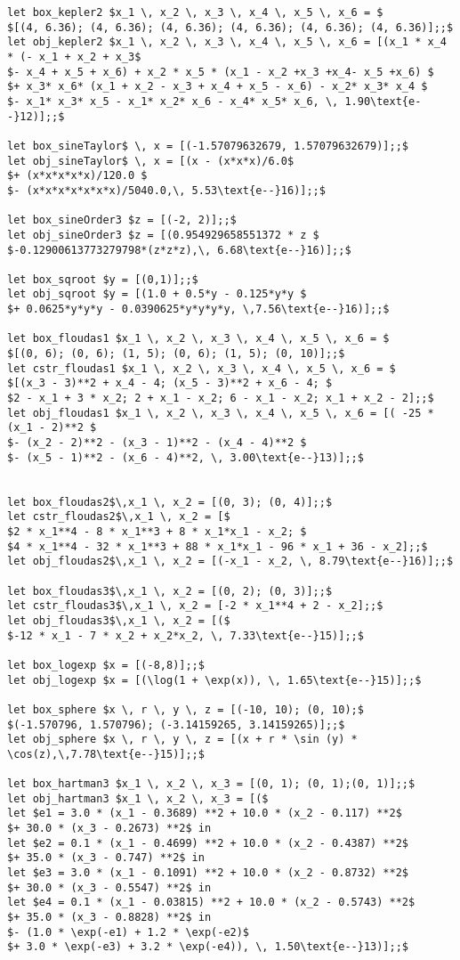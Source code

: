 {\begin{lstlisting}
let box_kepler2 $x_1 \, x_2 \, x_3 \, x_4 \, x_5 \, x_6 = $
$[(4, 6.36); (4, 6.36); (4, 6.36); (4, 6.36); (4, 6.36); (4, 6.36)];;$
let obj_kepler2 $x_1 \, x_2 \, x_3 \, x_4 \, x_5 \, x_6 = [(x_1 * x_4 * (- x_1 + x_2 + x_3$
$- x_4 + x_5 + x_6) + x_2 * x_5 * (x_1 - x_2 +x_3 +x_4- x_5 +x_6) $
$+ x_3* x_6* (x_1 + x_2 - x_3 + x_4 + x_5 - x_6) - x_2* x_3* x_4 $
$- x_1* x_3* x_5 - x_1* x_2* x_6 - x_4* x_5* x_6, \, 1.90\text{e--}12)];;$

let box_sineTaylor$ \, x = [(-1.57079632679, 1.57079632679)];;$
let obj_sineTaylor$ \, x = [(x - (x*x*x)/6.0$
$+ (x*x*x*x*x)/120.0 $
$- (x*x*x*x*x*x*x)/5040.0,\, 5.53\text{e--}16)];;$

let box_sineOrder3 $z = [(-2, 2)];;$
let obj_sineOrder3 $z = [(0.954929658551372 * z $
$-0.12900613773279798*(z*z*z),\, 6.68\text{e--}16)];;$

let box_sqroot $y = [(0,1)];;$
let obj_sqroot $y = [(1.0 + 0.5*y - 0.125*y*y $
$+ 0.0625*y*y*y - 0.0390625*y*y*y*y, \,7.56\text{e--}16)];;$

let box_floudas1 $x_1 \, x_2 \, x_3 \, x_4 \, x_5 \, x_6 = $
$[(0, 6); (0, 6); (1, 5); (0, 6); (1, 5); (0, 10)];;$
let cstr_floudas1 $x_1 \, x_2 \, x_3 \, x_4 \, x_5 \, x_6 = $
$[(x_3 - 3)**2 + x_4 - 4; (x_5 - 3)**2 + x_6 - 4; $
$2 - x_1 + 3 * x_2; 2 + x_1 - x_2; 6 - x_1 - x_2; x_1 + x_2 - 2];;$
let obj_floudas1 $x_1 \, x_2 \, x_3 \, x_4 \, x_5 \, x_6 = [( -25 * (x_1 - 2)**2 $
$- (x_2 - 2)**2 - (x_3 - 1)**2 - (x_4 - 4)**2 $
$- (x_5 - 1)**2 - (x_6 - 4)**2, \, 3.00\text{e--}13)];;$


let box_floudas2$\,x_1 \, x_2 = [(0, 3); (0, 4)];;$
let cstr_floudas2$\,x_1 \, x_2 = [$
$2 * x_1**4 - 8 * x_1**3 + 8 * x_1*x_1 - x_2; $
$4 * x_1**4 - 32 * x_1**3 + 88 * x_1*x_1 - 96 * x_1 + 36 - x_2];;$
let obj_floudas2$\,x_1 \, x_2 = [(-x_1 - x_2, \, 8.79\text{e--}16)];;$

let box_floudas3$\,x_1 \, x_2 = [(0, 2); (0, 3)];;$
let cstr_floudas3$\,x_1 \, x_2 = [-2 * x_1**4 + 2 - x_2];;$
let obj_floudas3$\,x_1 \, x_2 = [($
$-12 * x_1 - 7 * x_2 + x_2*x_2, \, 7.33\text{e--}15)];;$

let box_logexp $x = [(-8,8)];;$
let obj_logexp $x = [(\log(1 + \exp(x)), \, 1.65\text{e--}15)];;$

let box_sphere $x \, r \, y \, z = [(-10, 10); (0, 10);$
$(-1.570796, 1.570796); (-3.14159265, 3.14159265)];;$
let obj_sphere $x \, r \, y \, z = [(x + r * \sin (y) * \cos(z),\,7.78\text{e--}15)];;$

let box_hartman3 $x_1 \, x_2 \, x_3 = [(0, 1); (0, 1);(0, 1)];;$
let obj_hartman3 $x_1 \, x_2 \, x_3 = [($
let $e1 = 3.0 * (x_1 - 0.3689) **2 + 10.0 * (x_2 - 0.117) **2$
$+ 30.0 * (x_3 - 0.2673) **2$ in
let $e2 = 0.1 * (x_1 - 0.4699) **2 + 10.0 * (x_2 - 0.4387) **2$
$+ 35.0 * (x_3 - 0.747) **2$ in
let $e3 = 3.0 * (x_1 - 0.1091) **2 + 10.0 * (x_2 - 0.8732) **2$
$+ 30.0 * (x_3 - 0.5547) **2$ in
let $e4 = 0.1 * (x_1 - 0.03815) **2 + 10.0 * (x_2 - 0.5743) **2$
$+ 35.0 * (x_3 - 0.8828) **2$ in
$- (1.0 * \exp(-e1) + 1.2 * \exp(-e2)$
$+ 3.0 * \exp(-e3) + 3.2 * \exp(-e4)), \, 1.50\text{e--}13)];;$


\end{lstlisting}}

